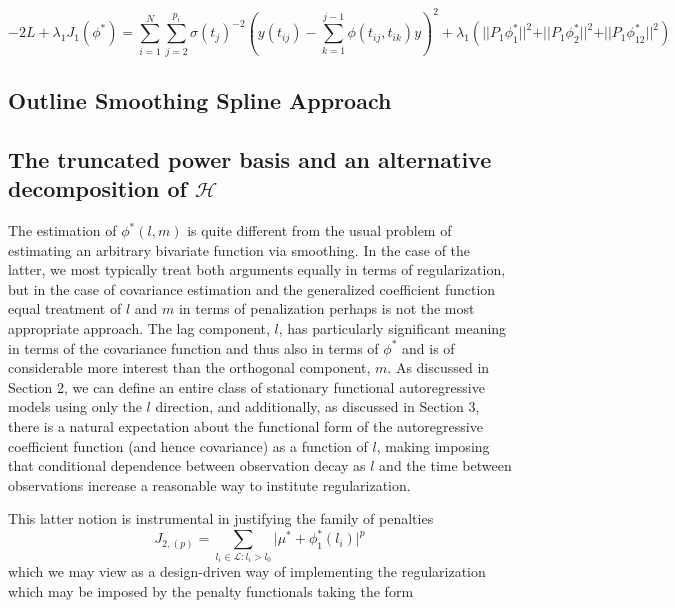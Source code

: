 \documentclass[12pt]{article}
\theoremstyle{definition}
\begin{document}
\begin{equation}
-2L + \lambda_1 J_1\left(\phi^*\right) = \sum_{i=1}^N \sum_{j=2}^{p_i} \sigma\left({t_j}\right)^{-2} \left(y\left({t_{ij}}\right) - \sum_{k=1}^{j-1}\phi\left({t_{ij},t_{ik}}\right)y\right)^2 + \lambda_1 \left(\vert \vert {P_1 \phi_1^*} \vert \vert^2 + \vert \vert {P_1 \phi_2^*} \vert \vert^2 + \vert \vert {P_1 \phi_{12}^*} \vert \vert^2 \right) \label{stage1obj}
\end{equation}



\subsection{Outline Smoothing Spline Approach}

\subsection{The truncated power basis and an alternative decomposition of $\mathcal{H}$}

The estimation of $\phi^*\left(l,m\right)$ is quite different from the usual problem of estimating an arbitrary bivariate function via smoothing. In the case of the latter, we most typically treat both arguments equally in terms of regularization, but in the case of covariance estimation and the generalized coefficient function equal treatment of $l$ and $m$ in terms of penalization perhaps is not the most appropriate approach. The lag component, $l$, has particularly significant meaning in terms of the covariance function and thus also in terms of $\phi^*$ and is of considerable more interest than the orthogonal component, $m$. As discussed in Section 2, we can define an entire class of stationary functional autoregressive models using only the $l$ direction, and additionally, as discussed in Section 3, there is a natural expectation about the functional form of the autoregressive coefficient function (and hence covariance) as a function of $l$, making imposing that conditional dependence between observation decay as $l$ and the time between observations increase a reasonable way to institute regularization.

This latter notion is instrumental in justifying the family of penalties
\[
J_{2,\left(p\right)} = \sum_{  l_i \in \mathcal{L}: l_i > l_0} \vert \mu^* + \phi^*_1\left(l_i\right) \vert^p 
\]
\noindent
which we may view as a design-driven way of implementing the regularization which may be imposed by the penalty functionals taking the form
\end{document}

